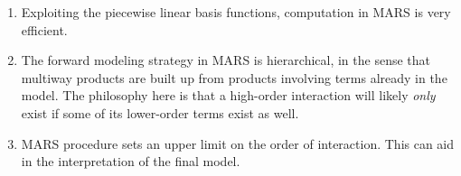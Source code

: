 \documentclass[12pt]{article}
\begin{document}
\begin{enumerate}[label=\textbf{\arabic*.}]
\begin{enumerate}
		\item Exploiting the piecewise linear basis functions, computation in MARS is very efficient. 
		
		\item The forward modeling strategy in MARS is hierarchical, in the sense that multiway products are built up from products involving terms already in the model. The philosophy here is that a high-order interaction will likely \emph{only} exist if some of its lower-order terms exist as well. 
		
		\item MARS procedure sets an upper limit on the order of interaction. This can aid in the interpretation of the final model. 
	
	\end{enumerate}
	
\end{enumerate}

\printbibliography
\end{document}
